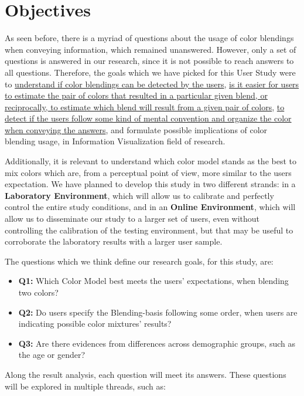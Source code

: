 \section{Objectives}
\label{sec:impl_objectives}
%
As seen before, there is a myriad of questions about the usage of color blendings when conveying information,
which remained unanswered. However, only a set of questions is answered in our research, since it is not possible
to reach answers to all questions. Therefore, the goals which we have picked for this User Study were to
\ul{understand if color blendings can be detected by the users}, \ul{is it easier for users to estimate the pair
of colors that resulted in a particular given blend, or reciprocally, to estimate which blend will result from a
given pair of colors}, \ul{to detect if the users follow some kind of mental convention and organize the color
when conveying the answers}, and formulate possible implications of color blending usage, in Information Visualization field of research. \par
%
Additionally, it is relevant to understand which color model stands as the best to mix colors which are, from a
perceptual point of view, more similar to the users expectation. We have planned to develop this study in two
different strands: in a \textbf{Laboratory Environment}, which will allow us to calibrate and perfectly control the
entire study conditions, and in an \textbf{Online Environment}, which will allow us to disseminate our study to a
larger set of users, even without controlling the calibration of the testing environment, but that may be useful
to corroborate the laboratory results with a larger user sample. \par
%
The questions which we think define our research goals, for this study, are:
%
\begin{itemize}
	\item \textbf{Q1:} Which Color Model best meets the users' expectations, when blending two colors?
	\item \textbf{Q2:} Do users specify the Blending-basis following some order, when users are indicating possible color
	mixtures' results?
	\item \textbf{Q3:} Are there evidences from differences across demographic groups, such as the age or gender?
\end{itemize}
%
Along the result analysis, each question will meet its answers. These questions will be explored in multiple
threads, such as:
%

